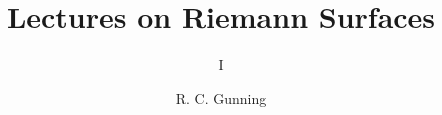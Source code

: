 \documentclass[graybox,envcountchap,sectrefs]{svmono}
\begin{document}
\author{R. C. Gunning}
\title{Lectures on Riemann Surfaces}
\subtitle{I}
\maketitle

\frontmatter%

% 
% 

% 

\tableofcontents

% 


\mainmatter%
% 




% 
% 
% 
% 
% 
% 
% 

\backmatter%

% 

\end{document}
